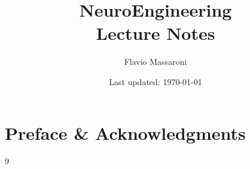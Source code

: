 \documentclass[letterpaper, 12pt]{article}
\newcommand{\1}{\mathds{1}}	%
\theoremstyle{definition}
\begin{document}

\title{NeuroEngineering \\[1em]
\normalsize Lecture Notes} %


\author{\normalsize Flavio Massaroni}
\date{\normalsize\vspace{-1ex} Last updated: \today}


\maketitle
\tableofcontents\label{sec:contents}

\newpage %

\section*{Preface \& Acknowledgments}



\vspace{2em}



\begin{thebibliography}{9}


\end{thebibliography}

\end{document}
